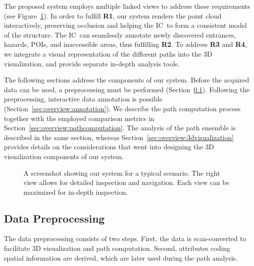 \documentclass{egpubl}
\def\IC{IC}
\begin{document}
The proposed system employs multiple linked views to address these requirements (see Figure~\ref{sec:overview:system}). In order to fulfill {\bfseries R1}, our system renders the point cloud interactively, preserving occlusion and helping the \IC\ to form a consistent model of the structure. The \IC\ can seamlessly annotate newly discovered entrances, hazards, POIs, and inaccessible areas, thus fulfilling {\bfseries R2}. To address {\bfseries R3} and {\bfseries R4}, we integrate a visual representation of the different paths into the 3D visualization, and provide separate in-depth analysis tools.

The following sections address the components of our system. Before the acquired data can be used, a preprocessing must be performed (Section~\ref{sec:overview:preprocessing}). Following the preprocessing, interactive data annotation is possible (Section~\ref{sec:overview:annotation}). We describe the path computation process together with the employed comparison metrics in Section~\ref{sec:overview:pathcomputation}. The analysis of the path ensemble is described in the same section, whereas Section~\ref{sec:overview:3dvisualization} provides details on the considerations that went into designing the 3D visualization components of our system.

\begin{figure}
    \centering
    \caption{A screenshot showing our system for a typical scenario. The right view allows for detailed inspection and navigation. Each view can be maximized for in-depth inspection.}
    \label{sec:overview:system}
\end{figure}


\subsection{Data Preprocessing} \label{sec:overview:preprocessing}
The data preprocessing consists of two steps. First, the data is scan-converted to facilitate 3D visualization and path computation. Second, attributes coding spatial information are derived, which are later used during the path analysis.
\end{document}
